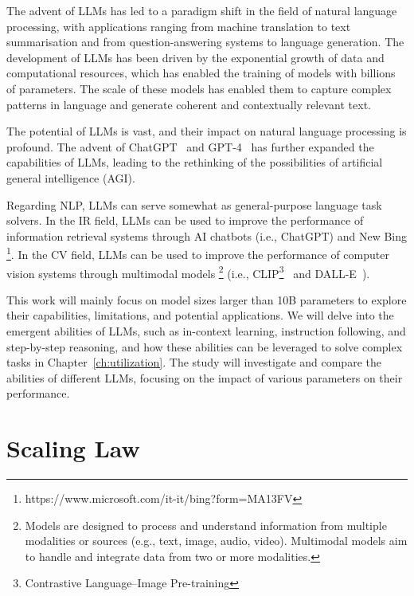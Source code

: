 \begin{enumerate}
{\begin{enumerate}
{			            }
		      \end{enumerate}
	      }
\end{enumerate}
The advent of LLMs has led to a paradigm shift in the field of natural language processing, with applications ranging from machine translation to text summarisation and from question-answering systems to language generation.
The development of LLMs has been driven by the exponential growth of data and computational resources, which has enabled the training of models with billions of parameters.
The scale of these models has enabled them to capture complex patterns in language and generate coherent and contextually relevant text.

The potential of LLMs is vast, and their impact on natural language processing is profound.
The advent of ChatGPT~\cite{adiwardana2020towards} and GPT-4~\cite{openai2024gpt4} has further expanded the capabilities of LLMs, leading to the rethinking of the possibilities of artificial general intelligence (AGI).

Regarding NLP, LLMs can serve somewhat as general-purpose language task solvers.
In the IR field, LLMs can be used to improve the performance of information retrieval systems through AI chatbots (i.e., ChatGPT) and New Bing \footnote{https://www.microsoft.com/it-it/bing?form=MA13FV}.
In the CV field, LLMs can be used to improve the performance of computer vision systems through multimodal models \footnote{
	Models are designed to process and understand information from multiple modalities or sources (e.g., text, image, audio, video).
	Multimodal models aim to handle and integrate data from two or more modalities.
} (i.e., CLIP\footnote{Contrastive Language–Image Pre-training}~\cite{radford2021learning} and DALL-E~\cite{ramesh2021zero}).

This work will mainly focus on model sizes larger than 10B parameters to explore their capabilities, limitations, and potential applications.
We will delve into the emergent abilities of LLMs, such as in-context learning, instruction following, and step-by-step reasoning, and how these abilities can be leveraged to solve complex tasks in Chapter~\ref{ch:utilization}.
The study will investigate and compare the abilities of different LLMs, focusing on the impact of various parameters on their performance.


\section{Scaling Law}
\label{sec:scaling-law-in-large-language-models}

